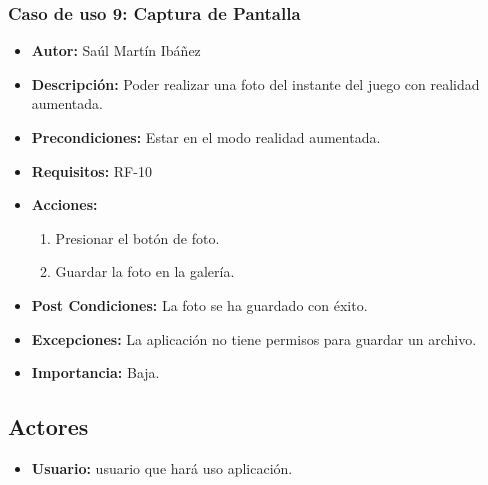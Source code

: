 \subsubsection{Caso de uso 9: Captura de Pantalla}
\begin{itemize}
	\item \textbf{Autor:} Saúl Martín Ibáñez
	\item \textbf{Descripción:} Poder realizar una foto del instante del juego con realidad aumentada.
	\item \textbf{Precondiciones:} Estar en el modo realidad aumentada.
	\item \textbf{Requisitos:} RF-10
	\item \textbf{Acciones:}
	\begin{enumerate}
		\item Presionar el botón de foto.
		\item Guardar la foto en la galería.
	\end{enumerate}
	\item \textbf{Post Condiciones:} La foto se ha guardado con éxito.
	\item \textbf{Excepciones:} La aplicación no tiene permisos para guardar un archivo.
	\item \textbf{Importancia:} Baja.
\end{itemize}

\subsection{Actores}
\begin{itemize}
	\item \textbf{Usuario:} usuario que hará uso aplicación.
\end{itemize}


